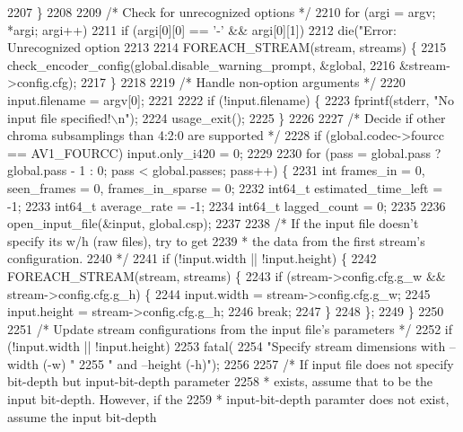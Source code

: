 \begin{DoxyCodeInclude}
{{{{{{{{{{{{{{{{{{{{{{{{{{{{{{{{{{{{{{{{{{{{{{{{{{{{{{{{{{{{{2207   \}
2208 
2209   \textcolor{comment}{/* Check for unrecognized options */}
2210   \textcolor{keywordflow}{for} (argi = argv; *argi; argi++)
2211     \textcolor{keywordflow}{if} (argi[0][0] == \textcolor{charliteral}{'-'} && argi[0][1])
2212       die(\textcolor{stringliteral}{"Error: Unrecognized option %
2213 
2214   FOREACH\_STREAM(stream, streams) \{
2215     check\_encoder\_config(global.disable\_warning\_prompt, &global,
2216         &stream->config.cfg);
2217   \}
2218 
2219   \textcolor{comment}{/* Handle non-option arguments */}
2220   input.filename = argv[0];
2221 
2222   \textcolor{keywordflow}{if} (!input.filename) \{
2223     fprintf(stderr, \textcolor{stringliteral}{"No input file specified!\(\backslash\)n"});
2224     usage\_exit();
2225   \}
2226 
2227   \textcolor{comment}{/* Decide if other chroma subsamplings than 4:2:0 are supported */}
2228   \textcolor{keywordflow}{if} (global.codec->fourcc == AV1\_FOURCC) input.only\_i420 = 0;
2229 
2230   \textcolor{keywordflow}{for} (pass = global.pass ? global.pass - 1 : 0; pass < global.passes; pass++) \{
2231     \textcolor{keywordtype}{int} frames\_in = 0, seen\_frames = 0, frames\_in\_sparse = 0;
2232     int64\_t estimated\_time\_left = -1;
2233     int64\_t average\_rate = -1;
2234     int64\_t lagged\_count = 0;
2235 
2236     open\_input\_file(&input, global.csp);
2237 
2238     \textcolor{comment}{/* If the input file doesn't specify its w/h (raw files), try to get}
2239 \textcolor{comment}{     * the data from the first stream's configuration.}
2240 \textcolor{comment}{     */}
2241     \textcolor{keywordflow}{if} (!input.width || !input.height) \{
2242       FOREACH\_STREAM(stream, streams) \{
2243         \textcolor{keywordflow}{if} (stream->config.cfg.g\_w && stream->config.cfg.g\_h) \{
2244           input.width = stream->config.cfg.g\_w;
2245           input.height = stream->config.cfg.g\_h;
2246           \textcolor{keywordflow}{break};
2247         \}
2248       \};
2249     \}
2250 
2251     \textcolor{comment}{/* Update stream configurations from the input file's parameters */}
2252     \textcolor{keywordflow}{if} (!input.width || !input.height)
2253       fatal(
2254           \textcolor{stringliteral}{"Specify stream dimensions with --width (-w) "}
2255           \textcolor{stringliteral}{" and --height (-h)"});
2256 
2257     \textcolor{comment}{/* If input file does not specify bit-depth but input-bit-depth parameter}
2258 \textcolor{comment}{     * exists, assume that to be the input bit-depth. However, if the}
2259 \textcolor{comment}{     * input-bit-depth paramter does not exist, assume the input bit-depth}
}}}}}}}}}}}}}}}}}}}}}}}}}}}}}}}}}}}}}}}}}}}}}}}}}}}}}}}}}}}}}}
\end{DoxyCodeInclude}
